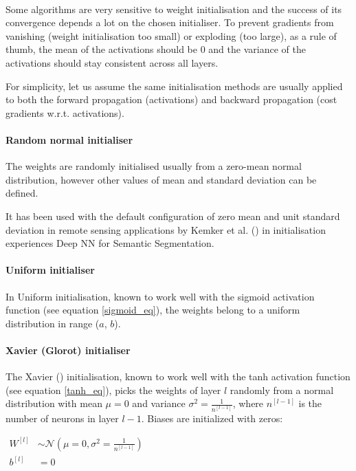\paragraph{}
Some algorithms are very sensitive to weight initialisation and the success of its convergence depends a lot on the chosen initialiser. To prevent gradients from vanishing (weight initialisation too small) or exploding (too large), as a rule of thumb, the mean of the activations should be $0$ and the variance of the activations should stay consistent across all layers.

For simplicity, let us assume the same initialisation methods are usually applied to both the forward propagation (activations) and backward propagation (cost gradients \gls{w.r.t.} activations).

\paragraph{Random normal initialiser} The weights are randomly initialised usually from a zero-mean normal distribution, however other values of mean and standard deviation can be defined. 

It has been used with the default configuration of zero mean and unit standard deviation in remote sensing applications by Kemker et al. (\cite{kemker2018algorithms}) in initialisation experiences Deep \gls{NN} for Semantic Segmentation.

\paragraph{Uniform initialiser} In Uniform initialisation, known to work well with the sigmoid activation function (see equation \ref{sigmoid_eq}), the weights belong to a uniform distribution in range ($a$, $b$).

\paragraph{Xavier (Glorot) initialiser} The Xavier (\cite{pmlrv9glorot10a}) initialisation, known to work well with the tanh activation function (see equation \ref{tanh_eq}), picks the weights of layer $l$ randomly from a normal distribution with mean $\mu = 0$ and variance $\sigma^2 = \frac{1}{n^{[l-1]}}$, where $n^{[l-1]}$ is the number of neurons in layer $l-1$. Biases are initialized with zeros:

$\begin{aligned}W^{[l]} &\sim \mathcal{N}(\mu=0,\sigma^2 = \frac{1}{n^{[l-1]}})\\ b^{[l]} &= 0\end{aligned}$

